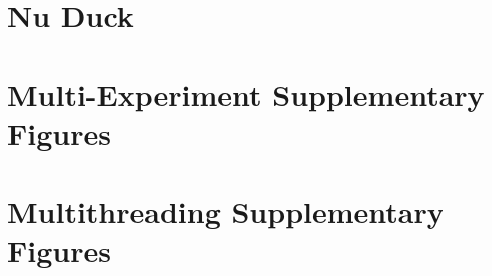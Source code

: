 \documentclass[PhD]{msu-thesis}
\begin{document}
\chapter{Nu Duck\label{sec:nu_duck}}

\begin{appendices}

\chapter{Multi-Experiment Supplementary Figures}\label{apdx:gd_spatial_maps}


\chapter{Multithreading Supplementary Figures}\label{apdx:mtd_supp_figures}


\end{appendices}

\backmatter
\SingleSpacing
\printbibliography
\end{document}
